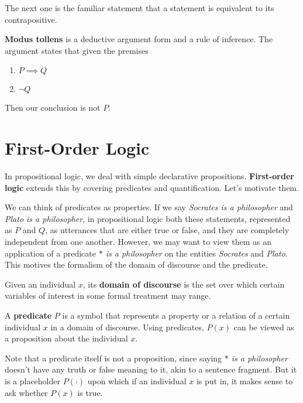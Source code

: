 \documentclass{article}
\begin{document}
    The next one is the familiar statement that a statement is equivalent to its contrapositive. 

    \begin{definition}
      \textbf{Modus tollens} is a deductive argument form and a rule of inference. The argument states that given the premises 
      \begin{enumerate}
        \item $P \implies Q$ 
        \item $\neg Q$ 
      \end{enumerate}
      Then our conclusion is not $P$. 
    \end{definition}

\section{First-Order Logic} 

  In propositional logic, we deal with simple declarative propositions. \textbf{First-order logic} extends this by covering predicates and quantification. Let's motivate them. 

  We can think of predicates as properties. If we say \textit{Socrates is a philosopher} and \textit{Plato is a philosopher}, in propositional logic both these statements, represented as $P$ and $Q$, as utterances that are either true or false, and they are completely independent from one another. However, we may want to view them as an application of a predicate \textit{ $\ast$ is a philosopher} on the entities \textit{Socrates} and \textit{Plato}. This motives the formalism of the domain of discourse and the predicate. 

  \begin{definition}
    Given an individual $x$, its \textbf{domain of discourse} is the set over which certain variables of interest in some formal treatment may range. 
  \end{definition}

  \begin{definition}[Predicate]
    A \textbf{predicate} $P$ is a symbol that represents a property or a relation of a certain individual $x$ in a domain of discourse. Using predicates, $P(x)$ can be viewed as a proposition about the individual $x$. 
  \end{definition} 

  Note that a predicate itself is not a proposition, since saying \textit{$\ast$ is a philosopher} doesn't have any truth or false meaning to it, akin to a sentence fragment. But it is a placeholder $P(\cdot)$ upon which if an individual $x$ is put in, it makes sense to ask whether $P(x)$ is true. 
\end{document}
